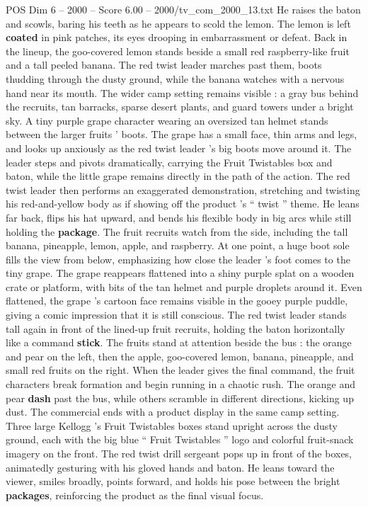 \begin{textsample}{POS Dim 6 – 2000 – Score 6.00 – 2000/tv\_com\_2000\_13.txt}
He raises the baton and scowls, baring his teeth as he appears to scold the lemon.
The lemon is left \textbf{coated} in pink patches, its eyes drooping in embarrassment or defeat.
Back in the lineup, the goo-covered lemon stands beside a small red raspberry-like fruit and a tall peeled banana.
The red twist leader marches past them, boots thudding through the dusty ground, while the banana watches with a nervous hand near its mouth.
The wider camp setting remains visible : a gray bus behind the recruits, tan barracks, sparse desert plants, and guard towers under a bright sky.
A tiny purple grape character wearing an oversized tan helmet stands between the larger fruits ’ boots.
The grape has a small face, thin arms and legs, and looks up anxiously as the red twist leader ’s big boots move around it.
The leader steps and pivots dramatically, carrying the Fruit Twistables box and baton, while the little grape remains directly in the path of the action.
The red twist leader then performs an exaggerated demonstration, stretching and twisting his red-and-yellow body as if showing off the product ’s “ twist ” theme.
He leans far back, flips his hat upward, and bends his flexible body in big arcs while still holding the \textbf{package}.
The fruit recruits watch from the side, including the tall banana, pineapple, lemon, apple, and raspberry.
At one point, a huge boot sole fills the view from below, emphasizing how close the leader ’s foot comes to the tiny grape.
The grape reappears flattened into a shiny purple splat on a wooden crate or platform, with bits of the tan helmet and purple droplets around it.
Even flattened, the grape ’s cartoon face remains visible in the gooey purple puddle, giving a comic impression that it is still conscious.
The red twist leader stands tall again in front of the lined-up fruit recruits, holding the baton horizontally like a command \textbf{stick}.
The fruits stand at attention beside the bus : the orange and pear on the left, then the apple, goo-covered lemon, banana, pineapple, and small red fruits on the right.
When the leader gives the final command, the fruit characters break formation and begin running in a chaotic rush.
The orange and pear \textbf{dash} past the bus, while others scramble in different directions, kicking up dust.
The commercial ends with a product display in the same camp setting.
Three large Kellogg ’s Fruit Twistables boxes stand upright across the dusty ground, each with the big blue “ Fruit Twistables ” logo and colorful fruit-snack imagery on the front.
The red twist drill sergeant pops up in front of the boxes, animatedly gesturing with his gloved hands and baton.
He leans toward the viewer, smiles broadly, points forward, and holds his pose between the bright \textbf{packages}, reinforcing the product as the final visual focus.

\end{textsample}
